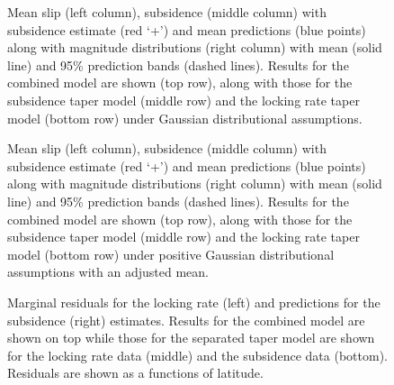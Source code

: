 {\begin{figure}
\centering
{}
\caption{Mean slip (left column), subsidence (middle column) with subsidence estimate (red `+') and mean predictions (blue points) along with magnitude distributions (right column) with mean (solid line) and 95\% prediction bands (dashed lines).  Results for the combined model are shown (top row), along with those for the subsidence taper model (middle row) and the locking rate taper model (bottom row) under Gaussian distributional assumptions.}
\label{modelSummaryN}
\end{figure}

\begin{figure}
\centering
{}
\caption{Mean slip (left column), subsidence (middle column) with subsidence estimate (red `+') and mean predictions (blue points) along with magnitude distributions (right column) with mean (solid line) and 95\% prediction bands (dashed lines).  Results for the combined model are shown (top row), along with those for the subsidence taper model (middle row) and the locking rate taper model (bottom row) under positive Gaussian distributional assumptions with an adjusted mean.}
\label{modelSummaryPNAdj}
\end{figure}

\begin{figure}
\centering
{}
\caption{Marginal residuals for the locking rate (left) and predictions for the subsidence (right) estimates.  Results for the combined model are shown on top while those for the separated taper model are shown for the locking rate data (middle) and the subsidence data (bottom).  Residuals are shown as a functions of latitude.}
\label{marginalResiduals}
\end{figure}

}
